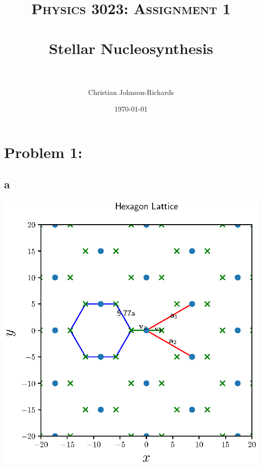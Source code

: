 \documentclass[paper=a4, fontsize=11pt]{scrartcl} %
\title{	
\normalfont \normalsize 
\textsc{Physics 3023: Assignment 1} \\ [25pt] %
\horrule{0.5pt} \\[0.4cm] %
\huge Stellar Nucleosynthesis \\ %
\horrule{0.5pt} \\[0.5cm] %
}
\author{
Christian Johnson-Richards
} %
\date{\normalsize\today} %
\numberwithin{equation}{section} %
\numberwithin{figure}{section} %
\numberwithin{table}{section} %
\begin{document}
\maketitle %
\clearpage




\section{Problem 1:}

\subsection{a}

\includegraphics[width=\linewidth]{Diagram}






\small
\clearpage
\twocolumn

%
%





\end{document}
